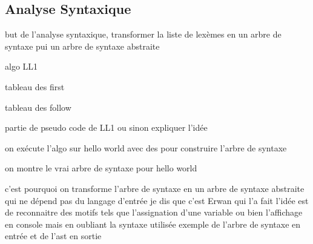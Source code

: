 \subsection{Analyse Syntaxique}

\begin{frame}
    but de l'analyse syntaxique, transformer la liste de lexèmes en un arbre de syntaxe pui un arbre de syntaxe abstraite
\end{frame}

\begin{frame}
    algo LL1
\end{frame}

\begin{frame}
    tableau des first 
\end{frame}

\begin{frame}
    tableau des follow 
\end{frame}

\begin{frame}
    partie de pseudo code de LL1 ou sinon expliquer l'idée
\end{frame}

\begin{frame}
    on exécute l'algo sur hello world avec des 
    pour construire l'arbre de syntaxe
\end{frame}


\begin{frame}
    on montre le vrai arbre de syntaxe pour hello world
\end{frame}

\begin{frame}
    c'est pourquoi on transforme l'arbre de syntaxe en un arbre de syntaxe abstraite qui ne dépend pas du langage d'entrée  
    je dis que c'est Erwan qui l'a fait
    l'idée est de reconnaitre des motifs tels que l'assignation d'une variable ou bien l'affichage en console mais en oubliant la syntaxe utilisée  
    exemple de l'arbre de syntaxe en entrée et de l'ast en sortie  
\end{frame}
